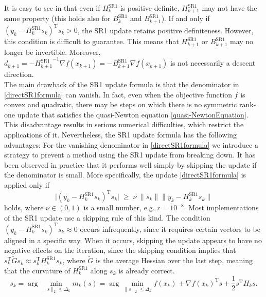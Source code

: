 It is easy to see in that even if $H^\mathrm{SR1}_k$ is positive definite, $H^\mathrm{SR1}_{k+1}$ may not have the same property (this holds also for $B^\mathrm{SR1}_k$ and $B^\mathrm{SR1}_{k+1}$). If and only if $(y_k - H^\mathrm{SR1}_k s_k)^{\mathrm{T}} s_k > 0$, the SR1 update retains positive definiteness. However, this condition is difficult to guarantee. This means that $H^\mathrm{SR1}_{k+1}$ or $B^\mathrm{SR1}_{k+1}$ may no longer be invertible. Moreover, $d_{k+1} = -{H^\mathrm{SR1}_{k+1}}^{-1} \nabla f(x_{k+1}) = -B^\mathrm{SR1}_{k+1} \nabla f(x_{k+1})$ is not necessarily a descent direction. \\
The main drawback of the SR1 update formula is that the denominator in \cref{directSR1formula} can vanish. In fact, even when the objective function $f$ is convex and quadratic, there may be steps on which there is no symmetric rank-one update that satisfies the quasi-Newton equation \cref{quasi-NewtonEquation}. This disadvantage results in serious numerical difficulties, which restrict the applications of it. Nevertheless, the SR1 update formula has the following advantages:
For the vanishing denominator in \cref{directSR1formula} we introduce a strategy to prevent a method using the SR1 update from breaking down. It has been observed in practice that it performs well simply by skipping the update if the denominator is small. More specifically, the update \cref{directSR1formula} is applied only if 
\begin{equation}\label{safeguard}
    \lvert (y_k - H^\mathrm{SR1}_k s_k)^{\mathrm{T}} s_k \lvert \; \geq \; \nu \; \lVert s_k \rVert \lVert y_k - H^\mathrm{SR1}_k s_k \rVert 
\end{equation}
holds, where $\nu \in (0, 1)$ is a small number, e.g. $r = 10^{−8}$. Most implementations of the SR1 update use a skipping rule of this kind. The condition $(y_k - H^\mathrm{SR1}_k s_k)^{\mathrm{T}} s_k \approx 0$ occurs infrequently, since it requires certain vectors to be aligned in a specific way. When it occurs, skipping the update appears to have no negative effects on the iteration, since the skipping condition implies that $s^{\mathrm{T}}_k \tilde{G} s_k \approx s^{\mathrm{T}}_k H^\mathrm{SR1}_k s_k$, where $\tilde{G}$ is the average Hessian over the last step, meaning that the curvature of $H^\mathrm{SR1}_k$ along $s_k$ is already correct. \\

\begin{equation}\label{trsubproblem}
    s_k = \arg \min_{\lVert s \rVert_2 \leq \Delta_k} m_k(s) = \arg \min_{\lVert s \rVert_2 \leq \Delta_k} f(x_k) + \nabla f(x_k)^{\mathrm{T}} s + \frac{1}{2} s^{\mathrm{T}} H_k s.
\end{equation}

